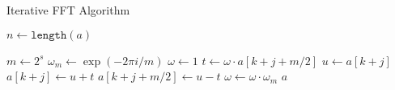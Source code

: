 \begin{algorithm}
 \caption{Iterative FFT Algorithm}
 \begin{algorithmic}[1]
    \State $n \gets \texttt{length}(a)$\\
      
      \State $m \gets 2^s$
      \State $\omega_m \gets \exp(-2\pi i/m)$
        \State $\omega \gets 1$
          \State $t \gets \omega \cdot a[k + j + m/2]$
          \State $u \gets a[k + j]$
          \State $a[k + j] \gets u + t$
          \State $a[k + j + m/2] \gets u - t$
          \State $\omega \gets \omega \cdot \omega_m$
        \EndFor
      \EndFor
    \EndFor
    \State \Return $a$
  \EndProcedure
 \end{algorithmic}
\end{algorithm}